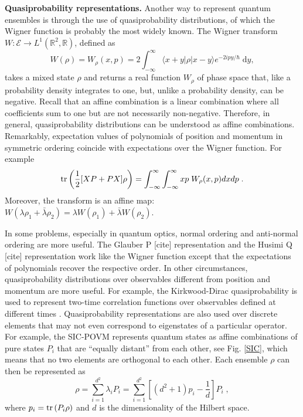 \documentclass[10pt,twocolumn, nofootinbib]{revtex4-2}
\newcommand{\Ens}[1][E] {\mathcal{#1}} %
\begin{document}

\textbf{Quasiprobability representations.} Another way to represent quantum ensembles is through the use of quasiprobability distributions, of which the Wigner function is probably the most widely known. The Wigner transform $W : \Ens \to L^1(\mathbb{R}^2, \mathbb{R}) $, defined as \cite[eq.~11.8-3a]{mandel1995}
\begin{equation}
	W(\rho) = W_{\rho} (x, p) = 2 \int_{-\infty}^{\infty} \langle x + y | \rho | x - y \rangle e^{-2 i p y / \hbar} \; \mathrm dy,
\end{equation}
takes a mixed state $\rho$ and returns a real function $W_{\rho}$ of phase space that, like a probability density integrates to one, but, unlike a probability density, can be negative. Recall that an affine combination is a linear combination where all coefficients sum to one but are not necessarily non-negative. Therefore, in general, quasiprobability distributions can be understood as affine combinations. Remarkably, expectation values of polynomials of position and momentum in symmetric ordering coincide with expectations over the Wigner function. For example
\begin{equation}
	\operatorname{tr} \left( \frac{1}{2}[XP+PX] \rho \right) = \int_{-\infty}^{\infty} \int_{-\infty}^{\infty} xp \; W_{\rho} (x, p) dx dp \; .
\end{equation}
Moreover, the transform is an affine map: $W(\lambda \rho_1 + \bar{\lambda} \rho_2 ) = \lambda W(\rho_1) + \bar{\lambda} W(\rho_2)$.

In some problems, especially in quantum optics, normal ordering and anti-normal ordering are more useful. The Glauber P [cite] representation and the Husimi Q [cite] representation work like the Wigner function except that the expectations of polynomials recover the respective order. In other circumstances, quasiprobability distributions over observables different from position and momentum are more useful. For example, the Kirkwood-Dirac quasiprobability is used to represent two-time correlation functions over observables defined at different times \cite{lostaglio2023}. Quasiprobability representations are also used over discrete elements that may not even correspond to eigenstates of a particular operator. For example, the SIC-POVM \cite{fuchs2004} represents quantum states as affine combinations of pure states $P_i$ that are ``equally distant'' from each other, see Fig. \ref{SIC}, which means that no two elements are orthogonal to each other. Each ensemble $\rho$ can then be represented as
\begin{equation}
	\rho = \sum_{i=1}^{d^2} \lambda_i P_i = \sum_{i=1}^{d^2} \left[ (d^2 + 1) p_i - \frac{1}{d} \right] P_i \; ,
\end{equation}
where $p_i = \operatorname{tr} \left(P_i \rho\right)$ and $d$ is the dimensionality of the Hilbert space.
\end{document}
